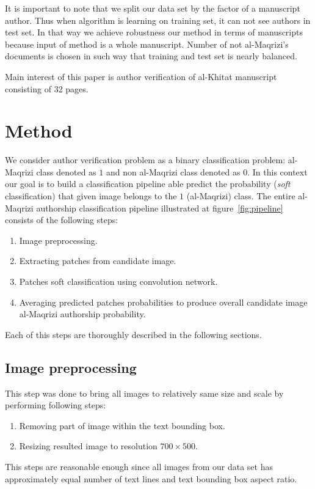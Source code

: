 \documentclass[conference,a4paper,twocolumn]{IEEEtran}
\newcommand{\convnet}{ConvNet~} %
\begin{document}
It is important to note that we split our data set by the factor of a manuscript author. Thus when algorithm is learning on training set, it can not see authors in test set. In that way we achieve robustness our method in terms of manuscripts because input of method is a whole manuscript. Number of not al-Maqrizi's documents is chosen in such way that training and test set is nearly balanced.

Main interest of this paper is author verification of al-Khitat manuscript consisting of 32 pages.



\section{Method}
\label{sec:the_method}

We consider author verification problem as a binary classification problem: al-Maqrizi class denoted as $1$ and non al-Maqrizi class denoted as $0$. In this context our goal is to build a classification pipeline able predict the probability (\textit{soft} classification) that given image belongs to the $1$ (al-Maqrizi) class. The entire al-Maqrizi authorship classification pipeline illustrated at figure~\ref{fig:pipeline} consists of the following steps:

\begin{enumerate}[start=0]
	\item Image preprocessing.
	\item Extracting patches from candidate image.
	\item Patches soft classification using convolution network.
	\item Averaging predicted patches probabilities to produce overall candidate image al-Maqrizi authorship probability.
\end{enumerate}

Each of this steps are thoroughly described in the following sections.	



\subsection{Image preprocessing}
This step was done to bring all images to relatively same size and scale by performing following steps:
\begin{enumerate}
	\item Removing part of image within the text bounding box.
	\item Resizing resulted image to resolution $700\times 500$.
\end{enumerate}
This steps are reasonable enough since all images from our data set has approximately equal number of text lines and text bounding box aspect ratio. 
\end{document}
